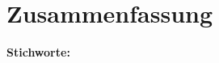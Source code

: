 \chapter{Zusammenfassung}
\begin{german}

\end{german}

\vskip 15mm

\noindent
\textbf{Stichworte:}
